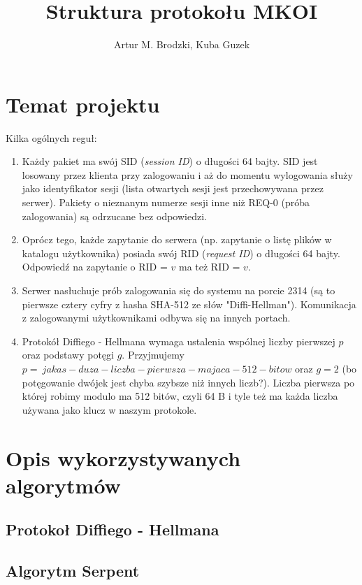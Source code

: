 \documentclass{article}
\author{Artur M. Brodzki, Kuba Guzek}
\title{Struktura protokołu MKOI}
\begin{document}
	\maketitle
	
	\section{Temat projektu}
	
	Kilka ogólnych reguł:
	\begin{enumerate}
		\item Każdy pakiet ma swój SID (\emph{session ID}) o długości 64 bajty. SID jest losowany przez klienta przy zalogowaniu i aż do momentu wylogowania służy jako identyfikator sesji (lista otwartych sesji jest przechowywana przez serwer). Pakiety o nieznanym numerze sesji inne niż REQ-0 (próba zalogowania) są odrzucane bez odpowiedzi. 
		\item Oprócz tego, każde zapytanie do serwera (np. zapytanie o listę plików w katalogu użytkownika) posiada swój RID (\emph{request ID}) o długości 64 bajty. Odpowiedź na zapytanie o RID = $v$ ma też RID = $v$. 
		\item Serwer nasłuchuje prób zalogowania się do systemu na porcie 2314 (są to pierwsze cztery cyfry z hasha SHA-512 ze słów "Diffi-Hellman"). Komunikacja z zalogowanymi użytkownikami odbywa się na innych portach. 
		\item Protokół Diffiego - Hellmana wymaga ustalenia wspólnej liczby pierwszej $p$ oraz podstawy potęgi $g$. Przyjmujemy $p=\ jakas-duza-liczba-pierwsza-majaca-512-bitow$ oraz $g=2$ (bo potęgowanie dwójek jest chyba szybsze niż innych liczb?). Liczba pierwsza po której robimy modulo ma 512 bitów, czyli 64 B i tyle też ma każda liczba używana jako klucz w naszym protokole. 
	\end{enumerate}

	\section{Opis wykorzystywanych algorytmów}
	
	\subsection{Protokoł Diffiego - Hellmana}
	
	\subsection{Algorytm Serpent}
	
\end{document}
